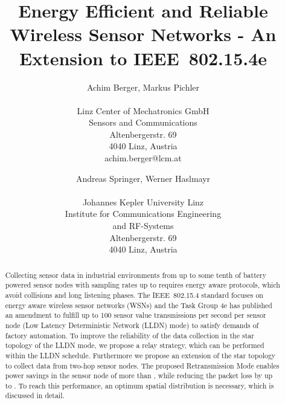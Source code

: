 \documentclass[times,10pt,twocolumn]{article}
\begin{document}
\title{Energy Efficient and Reliable Wireless Sensor Networks - An Extension to IEEE~802.15.4e}

\author{Achim Berger, Markus Pichler\\
\\
{\normalsize Linz Center of Mechatronics GmbH}\\
{\normalsize Sensors and Communications}\\
{\normalsize Altenbergerstr. 69}\\
{\normalsize 4040 Linz, Austria}\\
{\normalsize achim.berger@lcm.at}\\
\and
Andreas Springer, Werner Haslmayr\\
\\
{\normalsize Johannes Kepler University Linz}\\
{\normalsize Institute for Communications Engineering}\\
{\normalsize and RF-Systems}\\
{\normalsize Altenbergerstr. 69}\\
{\normalsize 4040 Linz, Austria}\\
}

\maketitle
\thispagestyle{empty}

\begin{abstract}
Collecting sensor data in industrial environments from up to some tenth of battery powered sensor nodes with sampling rates up to  requires energy aware protocols, which avoid collisions and long listening phases. The IEEE~802.15.4 standard focuses on energy aware wireless sensor networks (WSNs) and the Task Group 4e has published an amendment to fulfill up to 100 sensor value transmissions per second per sensor node (Low Latency Deterministic Network (LLDN) mode) to satisfy demands of factory automation. To improve the reliability of the data collection in the star topology of the LLDN mode, we propose a relay strategy, which can be performed within the LLDN schedule. Furthermore we propose an extension of the star topology to collect data from two-hop sensor nodes. The proposed Retransmission Mode enables power savings in the sensor node of more than , while reducing the packet loss by up to . To reach this performance, an optimum spatial distribution is necessary, which is discussed in detail.
\end{abstract}
\end{document}
